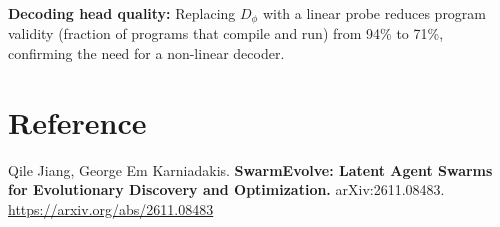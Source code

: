\documentclass[10pt,twocolumn]{article}
\begin{document}
\textbf{Decoding head quality:} Replacing $D_\phi$ with a linear probe
reduces program validity (fraction of programs that compile and run)
from 94\% to 71\%, confirming the need for a non-linear decoder.

\section*{Reference}

Qile Jiang, George Em Karniadakis.
\textbf{SwarmEvolve: Latent Agent Swarms for Evolutionary Discovery
and Optimization.}
arXiv:2611.08483.
\url{https://arxiv.org/abs/2611.08483}
\end{document}
